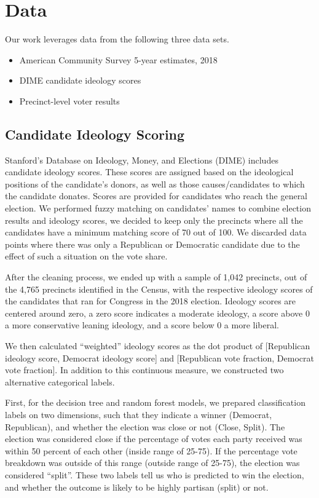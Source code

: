 \documentclass{article}
\begin{document}
\section{Data}
Our work leverages data from the following three data sets. 

\begin{itemize}
    \item American Community Survey 5-year estimates, 2018
    \item DIME candidate ideology scores
    \item Precinct-level voter results
\end{itemize}

\subsection{Candidate Ideology Scoring}
Stanford’s Database on Ideology, Money, and Elections (DIME) includes candidate ideology scores. These scores are assigned based on the ideological positions of the candidate’s donors, as well as those causes/candidates to which the candidate donates. Scores are provided for candidates who reach the general election. We performed fuzzy matching on candidates’ names to combine election results and ideology scores, we decided to keep only the precincts where all the candidates have a minimum matching score of 70 out of 100. We discarded data points where there was only a Republican or Democratic candidate due to the effect of such a situation on the vote share. 

After the cleaning process, we ended up with a sample of 1,042 precincts, out of the 4,765 precincts identified in the Census, with the respective ideology scores of the candidates that ran for Congress in the 2018 election. Ideology scores are centered around zero, a zero score indicates a moderate ideology, a score above 0 a more conservative leaning ideology, and a score below 0 a more liberal. 

We then calculated “weighted” ideology scores as the dot product of [Republican ideology score, Democrat ideology score] and [Republican vote fraction, Democrat vote fraction]. In addition to this continuous measure, we constructed two alternative categorical labels.

First, for the decision tree and random forest models, we prepared classification labels on two dimensions, such that they indicate a winner (Democrat, Republican), and whether the election was close or not (Close, Split). The election was considered close if the percentage of votes each party received was within 50 percent of each other (inside range of 25-75). If the percentage vote breakdown was outside of this range (outside range of 25-75), the election was considered “split”. These two labels tell us who is predicted to win the election, and whether the outcome is likely to be highly partisan (split) or not.
\end{document}
